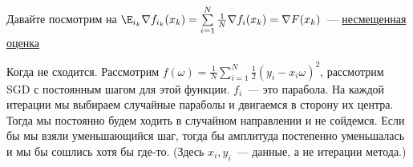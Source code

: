 

\begin{remark}
  Давайте посмотрим на $\E_{i_k} \nabla f_{i_k}(x_k) = \sum\limits_{i=1}^N \frac{1}{N} \nabla f_i(x_k)= \nabla F(x_k)$~--- \hyperref[note:CDE05262-E3D0-4D6B-B910-ACF2863C49F3]{несмещенная оценка}
\end{remark}

\begin{remark}
  Когда не сходится. Рассмотрим $f(\omega) = \frac{1}{N} \sum\limits_{i=1}^N \frac{1}{2} (y_i - x_i\omega)^2$, рассмотрим SGD с постоянным шагом для этой функции. $f_i$~--- это парабола. На каждой итерации мы выбираем случайные параболы и двигаемся в сторону их центра. Тогда мы постоянно будем ходить в случайном направлении и не сойдемся. Если бы мы взяли уменьшающийся шаг, тогда бы амплитуда постепенно уменьшалась и мы бы сошлись хотя бы где-то. (Здесь $x_i, y_i$~--- данные, а не итерации метода.)
\end{remark}

